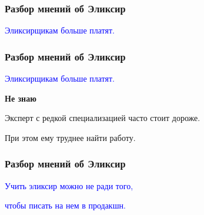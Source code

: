 \documentclass[10pt]{beamer}
\begin{document}




\begin{frame}
\frametitle{Разбор мнений об Эликсир}
\centering
\textcolor{blue}{Эликсирщикам больше платят.}
\end{frame}

\begin{frame}
\frametitle{Разбор мнений об Эликсир}
\centering
\textcolor{blue}{Эликсирщикам больше платят.}
\par \bigskip
\textbf{Не знаю}
\par \bigskip
Эксперт с редкой специализацией часто стоит дороже.
\par \bigskip
При этом ему труднее найти работу.
\end{frame}







\begin{frame}
\frametitle{Разбор мнений об Эликсир}
\centering
\textcolor{blue}{Учить эликсир можно не ради того,}
\par
\textcolor{blue}{чтобы писать на нем в продакшн.}
\end{frame}
\end{document}
